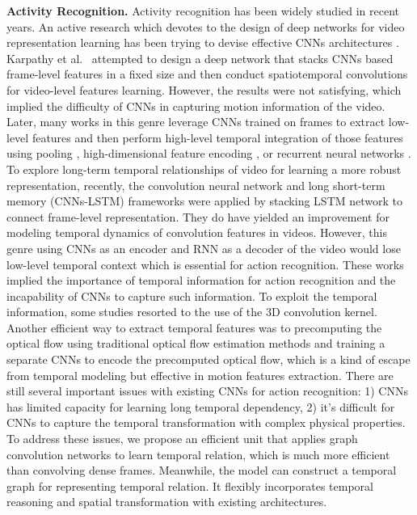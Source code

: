 \documentclass[conference,compsoc]{IEEEtran}
\begin{document}
    \textbf{Activity Recognition.} Activity recognition has been widely studied in recent years. An active research which devotes to the design of deep networks for video representation learning has been trying to devise effective CNNs architectures \cite{karpathy2014large, varol2018long, tran2017convnet, varol2018long, donahue2015long}. Karpathy et al.\ \cite{karpathy2014large} attempted to design a deep network that stacks CNNs based frame-level features in a fixed size and then conduct spatiotemporal convolutions for video-level features learning. However, the results were not satisfying, which implied the difficulty of CNNs in capturing motion information of the video. Later, many works in this genre leverage CNNs trained on frames to extract low-level features and then perform high-level temporal integration of those features using pooling \cite{wang2018video, wang2018learning}, high-dimensional feature encoding \cite{Girdhar2017ActionVLAD, diba2017deep}, or recurrent neural networks \cite{donahue2015long, wu2015modeling, varol2018long, yue2015beyond}. To explore long-term temporal relationships of video for learning a more robust representation, recently, the convolution neural network and long short-term memory (CNNs-LSTM) frameworks \cite{donahue2015long, wu2015modeling} were applied by stacking LSTM network to connect frame-level representation. They do have yielded an improvement for modeling temporal dynamics of convolution features in videos. However, this genre using CNNs as an encoder and RNN as a decoder of the video would lose low-level temporal context which is essential for action recognition. These works implied the importance of temporal information for action recognition and the incapability of CNNs to capture such information. To exploit the temporal information, some studies resorted to the use of the 3D convolution kernel. Another efficient way to extract temporal features was to precomputing the optical flow using traditional optical flow estimation methods and training a separate CNNs to encode the precomputed optical flow, which is a kind of escape from temporal modeling but effective in motion features extraction. There are still several important issues with existing CNNs for action recognition: 1) CNNs has limited capacity for learning long temporal dependency, 2) it's difficult for CNNs to capture the temporal transformation with complex physical properties. To address these issues, we propose an efficient unit that applies graph convolution networks to learn temporal relation, which is much more efficient than convolving dense frames. Meanwhile, the model can construct a temporal graph for representing temporal relation. It flexibly incorporates temporal reasoning and spatial transformation with existing architectures. 
    
\end{document}
